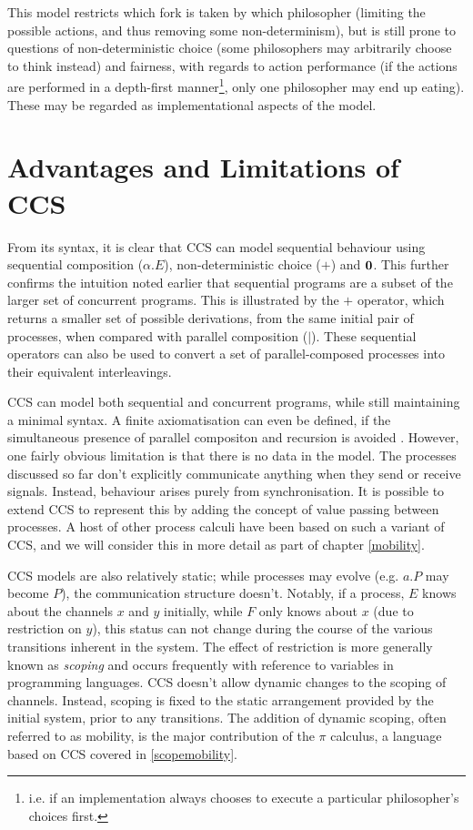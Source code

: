 This model restricts which fork is taken by which philosopher
(limiting the possible actions, and thus removing some
non-determinism), but is still prone to questions of non-deterministic
choice (some philosophers may arbitrarily choose to think instead) and
fairness, with regards to action performance (if the actions are
performed in a depth-first manner\footnote{i.e. if an implementation
  always chooses to execute a particular philosopher's choices
  first.}, only one philosopher may end up eating).  These may be
regarded as implementational aspects of the model.

\section{Advantages and Limitations of CCS}
\label{ccslimit}

From its syntax, it is clear that CCS can model sequential behaviour
using sequential composition ($\alpha.E$), non-deterministic choice
($+$) and $\textbf{0}$.  This further confirms the intuition noted earlier that
sequential programs are a subset of the larger set of concurrent
programs.  This is illustrated by the $+$ operator, which
returns a smaller set of possible derivations, from the same initial
pair of processes, when compared with parallel composition ($|$).
These sequential operators can also be used to convert a set of
parallel-composed processes into their equivalent interleavings.

CCS can model both sequential and concurrent programs, while still
maintaining a minimal syntax.  A finite axiomatisation can even be
defined, if the simultaneous presence of parallel compositon and
recursion is avoided \cite{milner:ccsaxiom}.  However, one fairly
obvious limitation is that there is no data in the model.  The
processes discussed so far don't explicitly communicate anything when
they send or receive signals.  Instead, behaviour arises purely from
synchronisation.  It is possible to extend CCS to represent this by
adding the concept of value passing between processes.  A host of
other process calculi have been based on such a variant of CCS, and we
will consider this in more detail as part of chapter \ref{mobility}.

CCS models are also relatively static; while processes may evolve
(e.g. $a.P$ may become $P$), the communication structure doesn't.
Notably, if a process, $E$ knows about the channels $x$ and $y$
initially, while $F$ only knows about $x$ (due to restriction on $y$),
this status can not change during the course of the various
transitions inherent in the system.  The effect of restriction is more
generally known as \emph{scoping} and occurs frequently with reference
to variables in programming languages.  CCS doesn't allow dynamic
changes to the scoping of channels.  Instead, scoping is fixed to the
static arrangement provided by the initial system, prior to any
transitions.  The addition of dynamic scoping, often referred to as
mobility, is the major contribution of the $\pi$ calculus, a language
based on CCS covered in \ref{scopemobility}.

